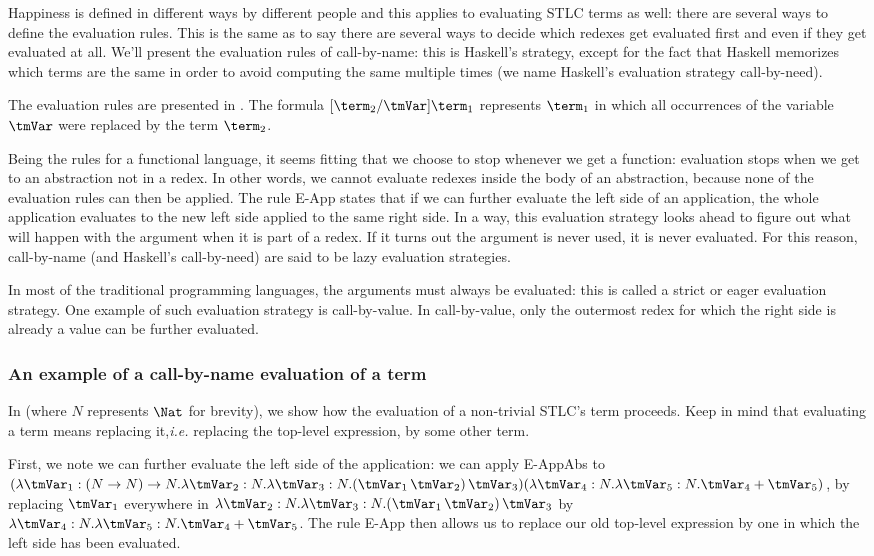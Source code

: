 Happiness is defined in different ways by different people and this applies to evaluating STLC terms as well: there are several ways to define the evaluation rules. This is the same as to say there are several ways to decide which redexes get evaluated first and even if they get evaluated at all. We'll present the evaluation rules of call-by-name: this is Haskell's strategy, except for the fact that Haskell memorizes which terms are the same in order to avoid computing the same multiple times (we name Haskell's evaluation strategy call-by-need).

The evaluation rules are presented in . The formula $[\term_2/\tmVar]\term_1$ represents $\term_1$ in which all occurrences of the variable $\tmVar$ were replaced by the term $\term_2$.

Being the rules for a functional language, it seems fitting that we choose to stop whenever we get a function: evaluation stops when we get to an abstraction not in a redex. In other words, we cannot evaluate redexes inside the body of an abstraction, because none of the evaluation rules can then be applied. The rule E-App states that if we can further evaluate the left side of an application, the whole application evaluates to the new left side applied to the same right side. In a way, this evaluation strategy looks ahead to figure out what will happen with the argument when it is part of a redex. If it turns out the argument is never used, it is never evaluated. For this reason, call-by-name (and Haskell's call-by-need) are said to be lazy evaluation strategies.

In most of the traditional programming languages, the arguments must always be evaluated: this is called a strict or eager evaluation strategy. One example of such evaluation strategy is call-by-value. In call-by-value, only the outermost redex for which the right side is already a value can be further evaluated.
\subsubsection{An example of a call-by-name evaluation of a term}
In  (where $N$ represents $\Nat$ for brevity), we show how the evaluation of a non-trivial STLC's term proceeds. Keep in mind that evaluating a term means replacing it,\textit{i.e.} replacing the top-level expression, by some other term.

First, we note we can further evaluate the left side of the application: we can apply E-AppAbs to $(\lambda \tmVar_1: (N \rightarrow N)\rightarrow N.\lambda \tmVar_2:N.\lambda \tmVar_3: N . (\tmVar_1 \, \tmVar_2)\,\tmVar_3) (\lambda \tmVar_4:N. \lambda \tmVar_5:N. \tmVar_4 + \tmVar_5)$, by replacing $\tmVar_1$ everywhere in $\lambda \tmVar_2:N.\lambda \tmVar_3: N . (\tmVar_1 \, \tmVar_2)\,\tmVar_3$ by $\lambda \tmVar_4:N. \lambda \tmVar_5:N. \tmVar_4 + \tmVar_5$. The rule E-App then allows us to replace our old top-level expression by one in which the left side has been evaluated.

